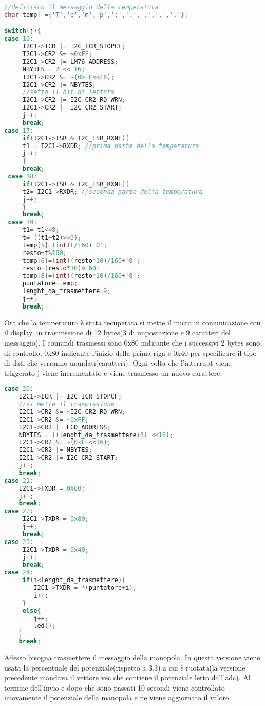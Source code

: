 \documentclass[main.tex]{subfiles}
\begin{document}
\begin{lstlisting}[language=C,caption=Lettura temperatura,label={lst:display_temp}]
//definisco il messaggio della temperatura
char temp[]={'T','e','m','p',':','.','.','.','.'};

switch(j){
case 16:
     I2C1->ICR |= I2C_ICR_STOPCF; 
     I2C1->CR2 &= ~0xFF; 
     I2C1->CR2 |= LM76_ADDRESS; 
     NBYTES = 2 << 16; 
     I2C1->CR2 &= ~(0xFF<<16); 
     I2C1->CR2 |= NBYTES; 
     //setto il bit di lettura
     I2C1->CR2 |= I2C_CR2_RD_WRN;
     I2C1->CR2 |= I2C_CR2_START; 
     j++;
     break;
case 17:
     if(I2C1->ISR & I2C_ISR_RXNE){ 
     t1 = I2C1->RXDR; //prima parte della temperatura
     j++;
     }
     break;
 case 18:
     if(I2C1->ISR & I2C_ISR_RXNE){
     t2= I2C1->RXDR; //seconda parte della temperatura
     j++;
     }
     break;
 case 19:
     t1= t1<<8; 
     t= ((t1+t2)>>3); 
     temp[5]=(int)t/160+'0';
     resto=t%160;
     temp[6]=(int)(resto*10)/160+'0';
     resto=(resto*10)%160;
     temp[8]=(int)(resto*10)/160+'0';
     puntatore=temp;
     lenght_da_trasmettere=9;
     j++;
     break; 
\end{lstlisting}
Ora che la temperatura è stata recuperata si mette il micro in comunicazione con il display, in trasmissione di 12 bytes(3 di impostazione e 9 caratteri del messaggio). 
I comandi trasmessi sono 0x80 indicante che i successivi 2 bytes sono di controllo, 0x80 indicante l'inizio della prima riga e 0x40 per specificare il tipo di dati che verranno mandati(caratteri). Ogni volta che l'interrupt viene triggerato j viene incrementato e viene trasmesso un nuovo carattere.
\begin{lstlisting}[language=C,caption=Trasmissione messaggio display]
case 20:
	I2C1->ICR |= I2C_ICR_STOPCF;
	//si mette il trasmissione
	I2C1->CR2 &= ~I2C_CR2_RD_WRN; 
	I2C1->CR2 &= ~0xFF; 
	I2C1->CR2 |= LCD_ADDRESS;
	NBYTES = ((lenght_da_trasmettere+3) <<16); 
	I2C1->CR2 &= ~(0xFF<<16); 
	I2C1->CR2 |= NBYTES; 
	I2C1->CR2 |= I2C_CR2_START; 
	j++;
	break; 
case 21:
	I2C1->TXDR = 0x80; 
	j++;
	break;
case 22:
	 I2C1->TXDR = 0x80;
	 j++;
	 break;
case 23:
	 I2C1->TXDR = 0x40;
	 j++;
	 break;
case 24:
	 if(i<lenght_da_trasmettere){
		I2C1->TXDR = *(puntatore+i);
		i++;
	 }
	 else{
		j++;
        led();
	}
	break;
\end{lstlisting}
Adesso bisogna trasmettere il messaggio della manopola. In questa versione viene usata la percentuale del potenziale(rispetto a 3.3) a cui è ruotata(la versione precedente mandava il vettore vec che contiene il potenziale letto dall'adc). Al termine dell'invio e dopo che sono passati 10 secondi viene controllato nuovamente il potenziale della manopola e ne viene aggiornato il valore.
\end{document}
